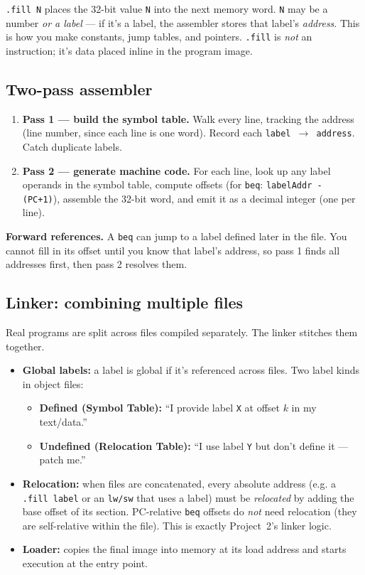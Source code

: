 \documentclass[10pt]{article}
\newcommand{\code}[1]{\texttt{\small #1}}
\begin{document}
\begin{keybox}[The \code{.fill} directive]
\code{.fill N} places the 32-bit value \code{N} into the next memory word. \code{N} may be a
number \emph{or a label} --- if it's a label, the assembler stores that label's \emph{address}.
This is how you make constants, jump tables, and pointers. \code{.fill} is \emph{not} an
instruction; it's data placed inline in the program image.
\end{keybox}

\subsection{Two-pass assembler}
\begin{enumerate}
\item \textbf{Pass 1 --- build the symbol table.} Walk every line, tracking the address (line
number, since each line is one word). Record each \texttt{label $\to$ address}. Catch duplicate labels.
\item \textbf{Pass 2 --- generate machine code.} For each line, look up any label operands in the
symbol table, compute offsets (for \code{beq}: \code{labelAddr - (PC+1)}), assemble the 32-bit
word, and emit it as a decimal integer (one per line).
\end{enumerate}

\begin{tipbox}
\textbf{Forward references.} A \code{beq} can jump to a label defined later in the file. You
cannot fill in its offset until you know that label's address, so pass 1 finds all addresses
first, then pass 2 resolves them.
\end{tipbox}

\subsection{Linker: combining multiple files}
Real programs are split across files compiled separately. The linker stitches them together.
\begin{itemize}
\item \textbf{Global labels:} a label is global if it's referenced across files. Two label kinds
in object files:
  \begin{itemize}
  \item \textbf{Defined (Symbol Table):} ``I provide label \code{X} at offset $k$ in my text/data.''
  \item \textbf{Undefined (Relocation Table):} ``I use label \code{Y} but don't define it --- patch me.''
  \end{itemize}
\item \textbf{Relocation:} when files are concatenated, every absolute address (e.g. a
\code{.fill label} or an \code{lw/sw} that uses a label) must be \emph{relocated} by adding the
base offset of its section. PC-relative \code{beq} offsets do \emph{not} need relocation (they
are self-relative within the file). This is exactly Project~2's linker logic.
\item \textbf{Loader:} copies the final image into memory at its load address and starts execution
at the entry point.
\end{itemize}
\end{document}

